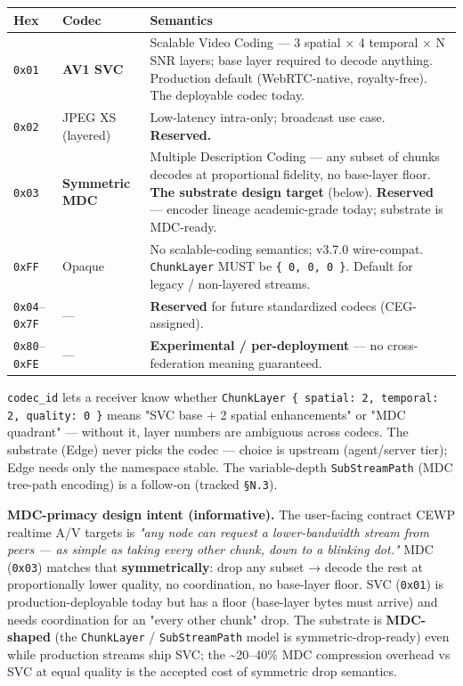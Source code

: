 \documentclass[11pt]{article}
\begin{document}
{\footnotesize
\begin{longtable}{|p{5.33cm}|p{5.33cm}|p{5.33cm}|}\hline
\textbf{Hex} & \textbf{Codec} & \textbf{Semantics} \\ \hline\endhead
\texttt{0x01} & \textbf{AV1 SVC} & Scalable Video Coding — 3 spatial × 4 temporal × N SNR layers; base layer required to decode anything. Production default (WebRTC-native, royalty-free). The deployable codec today. \\ \hline
\texttt{0x02} & JPEG XS (layered) & Low-latency intra-only; broadcast use case. \textbf{Reserved.} \\ \hline
\texttt{0x03} & \textbf{Symmetric MDC} & Multiple Description Coding — any subset of chunks decodes at proportional fidelity, no base-layer floor. \textbf{The substrate design target} (below). \textbf{Reserved} — encoder lineage academic-grade today; substrate is MDC-ready. \\ \hline
\texttt{0xFF} & Opaque & No scalable-coding semantics; v3.7.0 wire-compat. \texttt{ChunkLayer} MUST be \texttt{\{ 0, 0, 0 \}}. Default for legacy / non-layered streams. \\ \hline
\texttt{0x04}–\texttt{0x7F} & — & \textbf{Reserved} for future standardized codecs (CEG-assigned). \\ \hline
\texttt{0x80}–\texttt{0xFE} & — & \textbf{Experimental / per-deployment} — no cross-federation meaning guaranteed. \\ \hline
\end{longtable}}


\texttt{codec\_id} lets a receiver know whether \texttt{ChunkLayer \{ spatial: 2, temporal: 2, quality: 0 \}} means "SVC base + 2 spatial enhancements" or "MDC quadrant" — without it, layer numbers are ambiguous across codecs. The substrate (Edge) never picks the codec — choice is upstream (agent/server tier); Edge needs only the namespace stable. The variable-depth \texttt{SubStreamPath} (MDC tree-path encoding) is a follow-on (tracked \texttt{§N.3}).


\textbf{MDC-primacy design intent (informative).} The user-facing contract CEWP realtime A/V targets is \textit{"any node can request a lower-bandwidth stream from peers — as simple as taking every other chunk, down to a blinking dot."} MDC (\texttt{0x03}) matches that \textbf{symmetrically}: drop any subset → decode the rest at proportionally lower quality, no coordination, no base-layer floor. SVC (\texttt{0x01}) is production-deployable today but has a floor (base-layer bytes must arrive) and needs coordination for an "every other chunk" drop. The substrate is \textbf{MDC-shaped} (the \texttt{ChunkLayer} / \texttt{SubStreamPath} model is symmetric-drop-ready) even while production streams ship SVC; the \textasciitilde{}20–40\% MDC compression overhead vs SVC at equal quality is the accepted cost of symmetric drop semantics.
\end{document}
